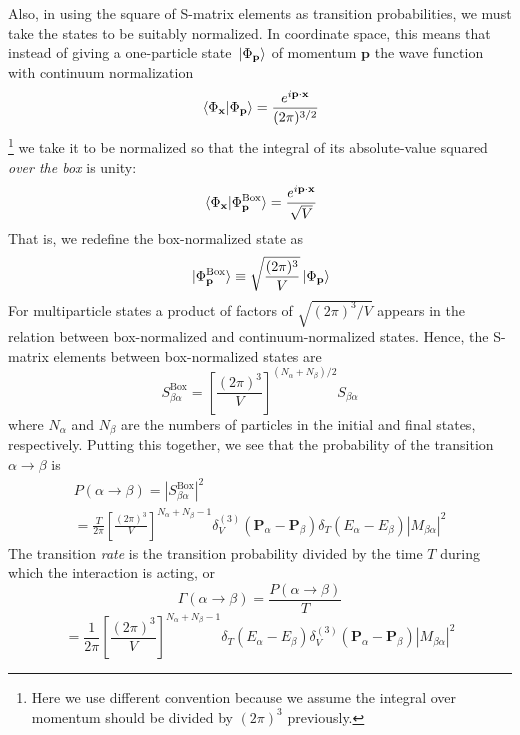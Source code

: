 \documentclass[12pt]{article}
\numberwithin{equation}{section}
\begin{document}
Also, in using the square of S-matrix elements as transition probabilities, we must take the states to be suitably normalized.
In coordinate space, this means that instead of giving a one-particle state $\ket*{\Phi_{\mathbf{p}}}$ of momentum $\mathbf{p}$ the wave function with continuum normalization
\[\braket*{\Phi_{\mathbf{x}}}{\Phi_{\mathbf{p}}} = \frac{e^{i\mathbf{p}\cdot\mathbf{x}}}{(2\pi)^{3/2}}\]\footnote{Here we use different convention because we assume the integral over momentum should be divided by $(2\pi)^3$ previously.}
we take it to be normalized so that the integral of its absolute-value squared \textit{over the box} is unity:
\begin{equation}
    \braket*{\Phi_{\mathbf{x}}}{\Phi_{\mathbf{p}}^{\text{Box}}} = \frac{e^{i\mathbf{p}\cdot\mathbf{x}}}{\sqrt{V}}
\end{equation}
That is, we redefine the box-normalized state as 
\begin{equation}
    \ket*{\Phi_{\mathbf{p}}^{\text{Box}}} \equiv \sqrt{\frac{(2\pi)^3}{V}}\ket*{\Phi_{\mathbf{p}}}
\end{equation}
For multiparticle states a product of factors of $\sqrt{(2\pi)^3/V}$ appears in the relation between box-normalized and continuum-normalized states.
Hence, the S-matrix elements between box-normalized states are 
\begin{equation}
    S_{\beta\alpha}^{\text{Box}} = \left[\frac{(2\pi)^3}{V}\right]^{(N_{\alpha}+N_{\beta})/2}S_{\beta\alpha}
\end{equation}
where $N_{\alpha}$ and $N_{\beta}$ are the numbers of particles in the initial and final states, respectively.
Putting this together, we see that the probability of the transition $\alpha\rightarrow\beta$ is
\begin{equation}
    \begin{split}
        P(\alpha\rightarrow\beta) = \left|S_{\beta\alpha}^{\text{Box}}\right|^2\\
        =\frac{T}{2\pi}\left[\frac{(2\pi)^3}{V}\right]^{N_{\alpha}+N_{\beta}-1}\delta^{(3)}_{V}(\mathbf{P}_{\alpha}-\mathbf{P}_{\beta})\delta_{T}(E_{\alpha}-E_{\beta})\left|M_{\beta\alpha}\right|^2
    \end{split}
\end{equation}
The transition \textit{rate} is the transition probability divided by the time $T$ during which the interaction is acting, or
\[\Gamma(\alpha\rightarrow\beta) = \frac{P(\alpha\rightarrow\beta)}{T}\]
\begin{equation}
    =\frac{1}{2\pi}\left[\frac{(2\pi)^3}{V}\right]^{N_{\alpha}+N_{\beta}-1}\delta_{T}(E_{\alpha}-E_{\beta})\delta_{V}^{(3)}(\mathbf{P}_{\alpha}-\mathbf{P}_{\beta})\left|M_{\beta\alpha}\right|^2
\end{equation}
\end{document}
